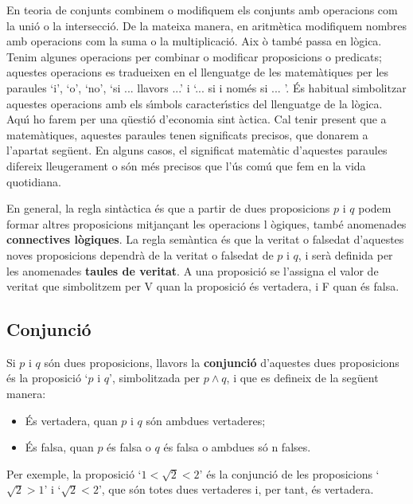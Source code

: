 En teoria de conjunts combinem o modifiquem els conjunts amb operacions com
la uni\'{o} o la intersecci\'{o}. De la mateixa manera, en aritm\`{e}tica
modifiquem nombres amb operacions com la suma o la multiplicaci\'{o}. Aix%
\`{o} tamb\'{e} passa en l\`{o}gica. Tenim algunes operacions per combinar o
modificar proposicions o predicats; aquestes operacions es tradueixen en el
llenguatge de les matem\`{a}tiques per les paraules `i', `o', `no', `si ...
llavors ...' i `... si i nom\'{e}s si ... '. \'{E}s habitual simbolitzar
aquestes operacions amb els s\'{\i}mbols caracter\'{\i}stics del llenguatge
de la l\`{o}gica. Aqu\'{\i} ho farem per una q\"{u}esti\'{o} d'economia sint%
\`{a}ctica. Cal tenir present que a matem\`{a}tiques, aquestes paraules
tenen significats precisos, que donarem a l'apartat seg\"{u}ent. En alguns
casos, el significat matem\`{a}tic d'aquestes paraules difereix lleugerament
o s\'{o}n m\'{e}s precisos que l'\'{u}s com\'{u} que fem en la vida
quotidiana.

En general, la regla sint\`{a}ctica \'{e}s que a partir de dues proposicions
$p$ i $q$ podem formar altres proposicions mitjan\c{c}ant les operacions l%
\`{o}giques, tamb\'{e} anomenades \textbf{connectives l\`{o}giques}. La
regla sem\`{a}ntica \'{e}s que la veritat o falsedat d'aquestes noves
proposicions dependr\`{a} de la veritat o falsedat de $p$ i $q$, i ser\`{a}
definida per les anomenades \textbf{taules de veritat}. A una proposici\'{o}
se l'assigna el valor de veritat que simbolitzem per V quan la proposici\'{o}
\'{e}s vertadera, i F quan \'{e}s falsa.

\subsection{Conjunci\'{o}}

Si $p$ i $q$ s\'{o}n dues proposicions, llavors la \textbf{conjunci\'{o}}
d'aquestes dues proposicions \'{e}s la proposici\'{o} `$p$ i $q$',
simbolitzada per $p\wedge q$, i que es defineix de la seg\"{u}ent manera:

\begin{itemize}
\item \'{E}s vertadera, quan $p$ i $q$ s\'{o}n ambdues vertaderes;

\item \'{E}s falsa, quan $p$ \'{e}s falsa o $q$ \'{e}s falsa o ambdues s\'{o}%
n falses.
\end{itemize}

Per exemple, la proposici\'{o} `$1<\sqrt{2}<2$' \'{e}s la conjunci\'{o} de
les proposicions `$\sqrt{2}>1$' i `$\sqrt{2}<2$', que s\'{o}n totes dues
vertaderes i, per tant, \'{e}s vertadera.

